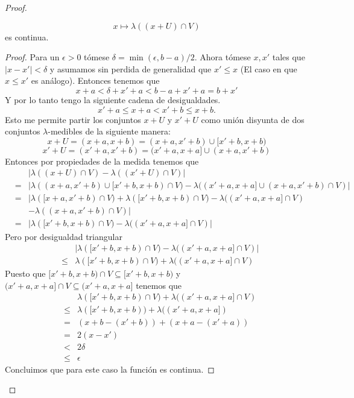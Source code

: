 \documentclass[letter,twoside,12pt]{article}
\numberwithin{equation}{section}
\begin{document}
\begin{proof}
\begin{lemma}
	\begin{equation*}
		x \mapsto \lambda((x+U) \cap V ) \nonumber
	\end{equation*} es continua. 
\end{lemma}
\begin{proof}
    	Para un $ \epsilon > 0 $ tómese $ \delta = \min(\epsilon,b-a)/2$. Ahora tómese $ x, x' $ tales que $ |x-x'|< \delta $ y asumamos sin perdida de generalidad que $ x' \leq x $ (El caso en que $x \leq x'$ es análogo). Entonces tenemos que 
      \begin{equation*}
      	x +a < \delta + x' + a < b-a +x' + a = b+x' \nonumber
      \end{equation*}
 Y por lo tanto tengo la siguiente cadena de desigualdades.
      \begin{equation*}
      	x'+a \leq x+a < x'+b \leq x+b. \nonumber
      \end{equation*}
Esto me permite partir los conjuntos $x+U$ y $x'+U$ como unión disyunta de dos conjuntos $\lambda$-medibles de la siguiente manera:
\begin{equation*}
      	x+U = (x+a,x+b) = (x+a,x'+b) \cup [x'+b, x+b) \nonumber
      \end{equation*}
      \begin{equation*}
      	x'+U = (x'+a,x'+b) = (x'+a,x+a] \cup (x+a, x'+b) \nonumber
      \end{equation*}
 Entonces por propiedades de la medida tenemos que
 \begin{eqnarray*}
 & & |\lambda((x+U) \cap V)- \lambda((x'+U) \cap V)|
 \\ &=& |\lambda((x+a,x'+b) \cup [x'+b, x+b) \cap V)- \lambda((x'+a,x+a] \cup (x+a, x'+b) \cap V)|
 \\ &=& |\lambda([x+a, x'+b) \cap V) +\lambda([x'+b, x+b) \cap V)- \lambda((x'+a,x+a] \cap V)
 \\& &-\lambda((x+a, x'+b) \cap V)|
 \\ &=& |\lambda([x'+b, x+b) \cap V)- \lambda((x'+a,x+a] \cap V)|
 \end{eqnarray*}
 Pero por desigualdad triangular
 \begin{eqnarray*}
 & &|\lambda([x'+b, x+b) \cap V)- \lambda((x'+a,x+a] \cap V)|
 \\&\leq & \lambda([x'+b, x+b) \cap V) + \lambda((x'+a,x+a] \cap V)
 \end{eqnarray*}
 Puesto que $[x'+b, x+b) \cap V \subseteq [x'+b, x+b)$ y $(x'+a,x+a] \cap V \subseteq (x'+a,x+a]$ tenemos que 
  \begin{eqnarray*}
 & &\lambda([x'+b, x+b) \cap V) + \lambda((x'+a,x+a] \cap V)
 \\&\leq & \lambda([x'+b, x+b)) + \lambda((x'+a,x+a])
 \\&= & (x+b-(x'+b)) + (x+a-(x'+a))
 \\& = & 2(x-x')
 \\ & < & 2\delta
 \\ & \leq & \epsilon
 \end{eqnarray*}
Concluimos que para este caso la función es continua.\end{proof}


\end{proof}
\end{document}
